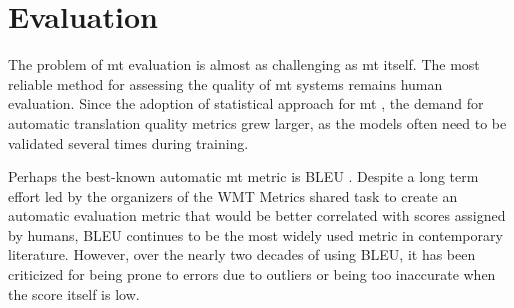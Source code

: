 \section{Evaluation}
\label{sec:evaluation}


The problem of \gls{mt} evaluation is almost as challenging as \gls{mt} itself.
The most reliable method for assessing the quality of \gls{mt} systems remains
human evaluation.  Since the adoption of statistical approach for \gls{mt}
\citep{brown-etal-1993-mathematics,koehn-etal-2003-statistical}, the demand for
automatic translation quality metrics grew larger, as the models often need to
be validated several times during training.

Perhaps the best-known automatic \gls{mt} metric is BLEU
\citep{papineni2002bleu}.  Despite a long term effort led by the organizers of
the WMT Metrics shared task to create an automatic evaluation metric that would
be better correlated with scores assigned by humans, BLEU continues to be the
most widely used metric in contemporary literature. However, over the nearly two
decades of using BLEU, it has been criticized for being prone to errors due to
outliers or being too inaccurate when the score itself is low.
\citep{callison-burch-etal-2006-evaluating,bojar-etal-2010-tackling,reiter2018structured,mathur-etal-2020-tangled}




